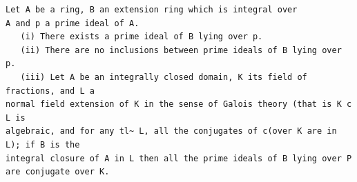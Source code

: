 \begin{theorem}\label{mcrt-auto-theorem-9-3}\uses{}
\begin{verbatim}
Let A be a ring, B an extension ring which is integral over
A and p a prime ideal of A.
   (i) There exists a prime ideal of B lying over p.
   (ii) There are no inclusions between prime ideals of B lying over p.
   (iii) Let A be an integrally closed domain, K its field of fractions, and L a
normal field extension of K in the sense of Galois theory (that is K c L is
algebraic, and for any tl~ L, all the conjugates of c(over K are in L); if B is the
integral closure of A in L then all the prime ideals of B lying over P
are conjugate over K.
\end{verbatim}
\end{theorem}
